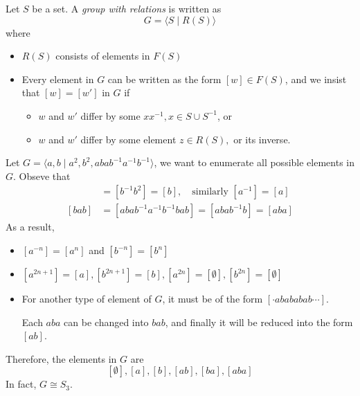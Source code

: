 \begin{definition}
Let $S$ be a set.
A \emph{group with relations} is written as
\[
G=\langle S\mid R(S)\rangle
\]
where
\begin{itemize}
\item
$R(S)$ consists of elements in $F(S)$
\item
Every element in $G$ can be written as the form $[w]\in F(S)$, and we insist that $[w]=[w']$ in $G$ if
\begin{itemize}
\item
$w$ and $w'$ differ by some $xx^{-1}, x\in S\cup S^{-1}$, or
\item
$w$ and $w'$ differ by some element $z\in R(S),$ or its inverse.
\end{itemize}
\end{itemize}
\end{definition}
\begin{example}
Let $G=\langle a,b\mid a^2,b^2,abab^{-1}a^{-1}b^{-1}\rangle$, we want to enumerate all possible elements in $G$.
Obseve that
\begin{align*}
[b^{-1}]&=[b^{-1}b^2]=[b],\quad \text{similarly }[a^{-1}]=[a]\\
[bab]&=[abab^{-1}a^{-1}b^{-1}bab]=[abab^{-1}b]=[aba]
\end{align*}
As a result,
\begin{itemize}
\item
$[a^{-n}]=[a^n]$ and $[b^{-n}]=[b^n]$
\item
$[a^{2n+1}]=[a],[b^{2n+1}]=[b],[a^{2n}]=[\emptyset],[b^{2n}]=[\emptyset]$
\item
For another type of element of $G$, it must be of the form $[\cdot abababab\cdots]$.

Each $aba$ can be changed into $bab$, and finally it will be reduced into the form $[ab]$.
\end{itemize}
Therefore, the elements in $G$ are
\[
[\emptyset],[a],[b],[ab],[ba],[aba]
\]
In fact, $G\cong S_3$.
\end{example}














